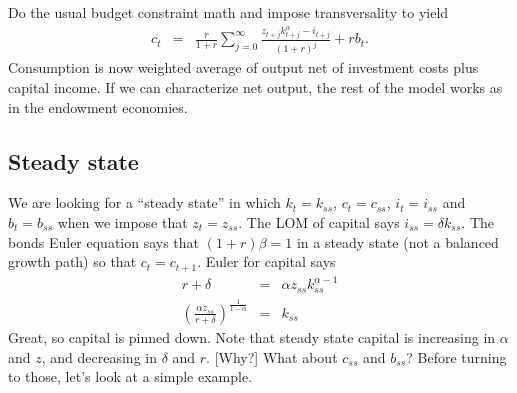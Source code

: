 \documentclass[11pt,pdftex,twoside,letterpaper]{exam}
\begin{document}
Do the usual budget constraint math and impose transversality to yield
\begin{eqnarray}
  c_t &=& \frac{r}{1+r}\sum_{j=0}^\infty\frac{z_{t+j}k_{t+j}^\alpha-i_{t+j}}{(1+r)^j}+rb_t.
\end{eqnarray}
Consumption is now weighted average of output net of investment costs plus capital income. If we can characterize net output, the rest of the model works as in the endowment economies.
\subsection{Steady state}
We are looking for a ``steady state'' in which $k_t=k_{ss}$, $c_t=c_{ss}$, $i_t=i_{ss}$ and $b_t=b_{ss}$ when we impose that $z_t=z_{ss}$. The LOM of capital says $i_{ss}=\delta k_{ss}$. The bonds Euler equation says that $(1+r)\beta=1$ in a steady state (not a balanced growth path) so that $c_t=c_{t+1}$. Euler for capital says
\begin{eqnarray}
  r+\delta &=& \alpha z_{ss}k_{ss}^{\alpha-1}\\
  \left(\frac{\alpha z_{ss}}{r+\delta}\right)^\frac{1}{1-\alpha} &=& k_{ss}
\end{eqnarray}
Great, so capital is pinned down. Note that steady state capital is increasing in $\alpha$ and $z$, and decreasing in $\delta$ and $r$. [Why?] What about $c_{ss}$ and $b_{ss}$? Before turning to those, let's look at a simple example.
\end{document}
